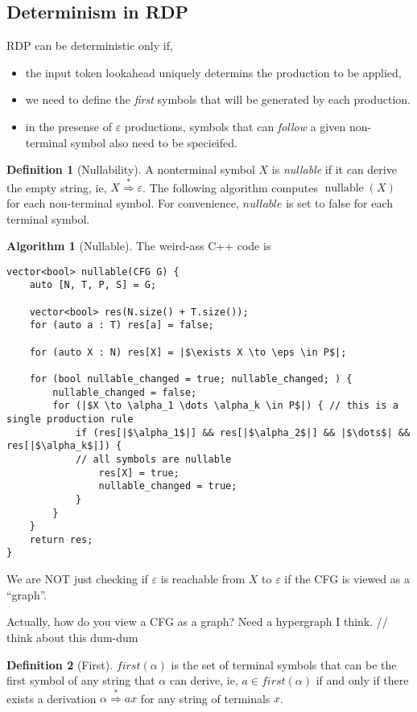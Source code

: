 \documentclass[a4paper]{scrartcl}
\theoremstyle{definition}
\newtheorem{definition}{Definition}
\newtheorem{algorithm}{Algorithm}
\newcommand{\eps}{\varepsilon}
\newcommand{\derives}{\stackrel{*}{\Rightarrow}}
\begin{document}
\subsection{Determinism in RDP}
RDP can be deterministic only if,
\begin{itemize}
	\item the input token lookahead uniquely determins the production to be applied,
	\item we need to define the \emph{first} symbols that will be generated by each production.
	\item in the presense of $\eps$ productions, symbols that can \emph{follow} a given non-terminal symbol also need to be specieifed.
\end{itemize}

\begin{definition}[Nullability]
\item A nonterminal symbol $X$ is \emph{nullable} if it can derive the empty string, ie, $X \derives \eps$.
	The following algorithm computes $\mathop{nullable}(X)$ for each non-terminal symbol. For convenience, $nullable$ is set to false for each terminal symbol.
\end{definition}

\begin{algorithm}[Nullable]
	The weird-ass C++ code is
\begin{verbatim}
vector<bool> nullable(CFG G) {
	auto [N, T, P, S] = G;

	vector<bool> res(N.size() + T.size());
	for (auto a : T) res[a] = false;

	for (auto X : N) res[X] = |$\exists X \to \eps \in P$|;

	for (bool nullable_changed = true; nullable_changed; ) {
		nullable_changed = false;
		for (|$X \to \alpha_1 \dots \alpha_k \in P$|) { // this is a single production rule
			if (res[|$\alpha_1$|] && res[|$\alpha_2$|] && |$\dots$| && res[|$\alpha_k$|]) { 
			// all symbols are nullable
				res[X] = true;
				nullable_changed = true;
			}
		}
	}
	return res;
}
\end{verbatim}
\end{algorithm}
We are NOT just checking if $\eps$ is reachable from $X$ to $\eps$ if the CFG is viewed as a ``graph''.

Actually, how do you view a CFG as a graph? Need a hypergraph I think. // think about this dum-dum

\begin{definition}[First]
	$first(\alpha)$ is the set of terminal symbols that can be the first symbol of any string that $\alpha$ can derive, ie, $a \in first(\alpha)$ if and only if there exists a derivation $\alpha \derives a x$ for any string of terminals $x$.
\end{definition}
\end{document}
